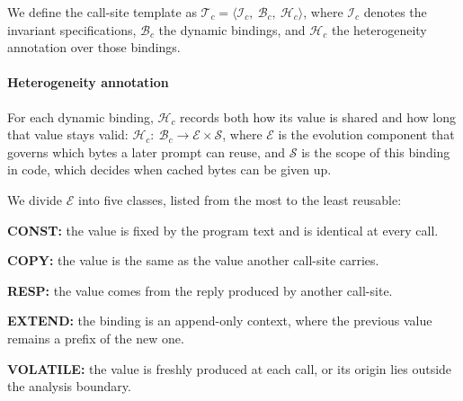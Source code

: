 We define the call-site template as $\mathcal{T}_c=\langle \mathcal{I}_c,\ \mathcal{B}_c,\ \mathcal{H}_c \rangle$, where $\mathcal{I}_c$ denotes the invariant specifications, $\mathcal{B}_c$ the dynamic bindings, and $\mathcal{H}_c$ the heterogeneity annotation over those bindings.

\paragraph{Heterogeneity annotation}
For each dynamic binding, $\mathcal{H}_c$ records both how its value is shared and how long that value stays valid: $\mathcal{H}_c:\ \mathcal{B}_c \longrightarrow \mathcal{E} \times \mathcal{S}$, where $\mathcal{E}$ is the evolution component that governs which bytes a later prompt can reuse, and $\mathcal{S}$ is the scope of this binding in code, which decides when cached bytes can be given up.

We divide $\mathcal{E}$ into five classes, listed from the most to the least reusable:
\begin{enumerate*}[label=\textbf{(\roman*)}]
    \item \textbf{CONST:} the value is fixed by the program text and is identical at every call.
    \item \textbf{COPY:} the value is the same as the value another call-site carries.
    \item \textbf{RESP:} the value comes from the reply produced by another call-site.
    \item \textbf{EXTEND:} the binding is an append-only context, where the previous value remains a prefix of the new one.
    \item \textbf{VOLATILE:} the value is freshly produced at each call, or its origin lies outside the analysis boundary.
\end{enumerate*}

